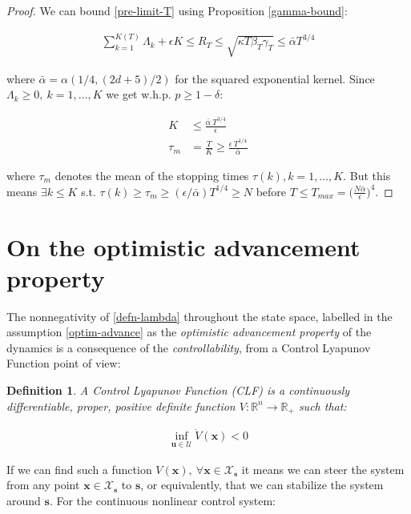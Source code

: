 \documentclass[10pt,a4paper]{article}
\newcommand{\state}{\mathbf{x}} %
\newcommand{\traj}{\mathbf{s}} %
\newcommand{\sysInput}{\mathbf{u}} %
\newtheorem{defn}{Definition}
\begin{document}
\begin{proof}
We can bound \eqref{pre-limit-T} using Proposition \ref{gamma-bound}:

\begin{align}
\sum_{k=1}^{K(T)}\Lambda_k + \epsilon K \leq R_{T} \leq \sqrt{\kappa T \beta_{T} \gamma_{T}} \leq \bar{\alpha}T^{3/4}
\end{align}

where $\bar{\alpha} = \alpha(1/4,(2d+5)/2)$ for the squared exponential kernel. Since $\Lambda_k \geq 0, \ k = 1, \ldots, K$ we get w.h.p. $p \geq 1 - \delta$:

\begin{align}
K &\leq \frac{\bar{\alpha} \ T^{3/4}}{\epsilon} \\
\tau_m &= \frac{T}{K} \geq \frac{\epsilon \ T^{1/4}}{\bar{\alpha}}
\end{align}

where $\tau_m$ denotes the mean of the stopping times $\tau(k), k = 1, \ldots, K$. But this means $\exists k \leq K$ s.t. $\tau(k) \geq \tau_m \geq (\epsilon/\bar{\alpha})T^{1/4} \geq N$ before $T \leq T_{max} = \big(\frac{N\bar{\alpha}}{\epsilon}\big)^{4}$.

\end{proof}

\section{On the optimistic advancement property}

The nonnegativity of \eqref{defn-lambda} throughout the state space, labelled in the assumption \eqref{optim-advance} as the \emph{optimistic advancement property} of the dynamics is a consequence of the \emph{controllability}, from a Control Lyapunov Function point of view:

\begin{defn}
A \emph{Control Lyapunov Function} (CLF) is a continuously differentiable, proper, positive definite function $V: \mathbb{R}^{n} \to \mathbb{R}_{+}$ such that:

\begin{align}
\inf_{\sysInput \in \mathcal{U}}\dot{V}(\state) < 0 \label{CLF}
\end{align}

\end{defn}

If we can find such a function $V(\state), \ \forall \state \in \mathcal{X}_{\traj}$ it means we can steer the system from any point $\state \in \mathcal{X}_{\traj}$ to $\traj$, or equivalently, that we can stabilize the system around $\traj$. For the continuous nonlinear control system:
\end{document}
